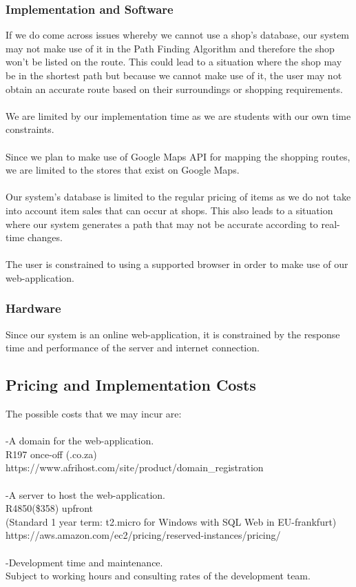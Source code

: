 \documentclass[12pt]{article}
\begin{document}
\subsubsection{Implementation and Software}
If we do come across issues whereby we cannot use a shop's database, our system may not make use of it in the Path Finding Algorithm and therefore the shop won't be listed on the route. This could lead to a situation where the shop may be in the shortest path but because we cannot make use of it, the user may not obtain an accurate route based on their surroundings or shopping requirements.\\\\
We are limited by our implementation time as we are students with our own time constraints.\\\\
Since we plan to make use of Google Maps API for mapping the shopping routes, we are limited to the stores that exist on Google Maps.\\\\
Our system's database is limited to the regular pricing of items as we do not take into account item sales that can occur at shops. This also leads to a situation where our system generates a path that may not be accurate according to real-time changes.\\\\
The user is constrained to using a supported browser in order to make use of our web-application.
\subsubsection{Hardware}
Since our system is an online web-application, it is constrained by the response time and performance of the server and internet connection.

\subsection{Pricing and Implementation Costs}
The possible costs that we may incur are:\\\\
-A domain for the web-application.\\
 R197 once-off   (.co.za)\\
 https://www.afrihost.com/site/product/domain{\_}registration\\\\
-A server to host the web-application.\\
R4850(\$358) upfront \\
(Standard 1 year term: t2.micro for Windows with SQL Web in EU-frankfurt)\\
https://aws.amazon.com/ec2/pricing/reserved-instances/pricing/\\\\
-Development time and maintenance.\\
Subject to working hours and consulting rates of the development team.
\end{document}
